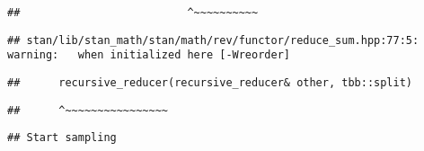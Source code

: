 \documentclass[
]{article}
\begin{document}
\begin{verbatim}
##                          ^~~~~~~~~~~
\end{verbatim}

\begin{verbatim}
## stan/lib/stan_math/stan/math/rev/functor/reduce_sum.hpp:77:5: warning:   when initialized here [-Wreorder]
\end{verbatim}

\begin{verbatim}
##      recursive_reducer(recursive_reducer& other, tbb::split)
\end{verbatim}

\begin{verbatim}
##      ^~~~~~~~~~~~~~~~~
\end{verbatim}

\begin{verbatim}
## Start sampling
\end{verbatim}
\end{document}
